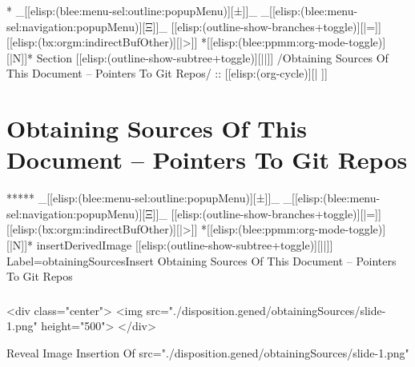\begin{whenOrg}
\begin{whenOrg}
*  _[[elisp:(blee:menu-sel:outline:popupMenu)][±]]_ _[[elisp:(blee:menu-sel:navigation:popupMenu)][Ξ]]_ [[elisp:(outline-show-branches+toggle)][|=]] [[elisp:(bx:orgm:indirectBufOther)][|>]] *[[elisp:(blee:ppmm:org-mode-toggle)][|N]]*  Section    [[elisp:(outline-show-subtree+toggle)][||]]   /Obtaining Sources Of This Document -- Pointers To Git Repos/ ::  [[elisp:(org-cycle)][| ]]
\end{whenOrg}

\section{Obtaining Sources Of This Document -- Pointers To Git Repos}


\begin{whenOrg}
*****  _[[elisp:(blee:menu-sel:outline:popupMenu)][±]]_ _[[elisp:(blee:menu-sel:navigation:popupMenu)][Ξ]]_ [[elisp:(outline-show-branches+toggle)][|=]] [[elisp:(bx:orgm:indirectBufOther)][|>]] *[[elisp:(blee:ppmm:org-mode-toggle)][|N]]*  insertDerivedImage [[elisp:(outline-show-subtree+toggle)][||]] Label=obtainingSourcesInsert Obtaining Sources Of This Document -- Pointers To Git Repos
\end{whenOrg}

\begin{frame}[fragile,plain,label=obtainingSourcesInsert]
    \frametitle{}
    \framesubtitle{}


\begin{htmlonly} %
    \begin{rawhtml}
<div class="center">
<img src="./disposition.gened/obtainingSources/slide-1.png" height="500">
</div>
    \end{rawhtml}
\end{htmlonly}

\begin{latexonly}

Reveal Image Insertion Of src="./disposition.gened/obtainingSources/slide-1.png"


\end{latexonly}
\end{frame}
\end{whenOrg}
